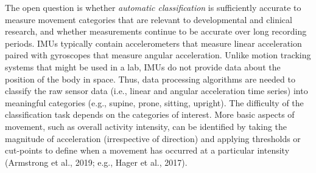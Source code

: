 \documentclass[
  man]{apa6}
\begin{document}
The open question is whether \emph{automatic classification} is sufficiently accurate to measure movement categories that are relevant to developmental and clinical research, and whether measurements continue to be accurate over long recording periods. IMUs typically contain accelerometers that measure linear acceleration paired with gyroscopes that measure angular acceleration. Unlike motion tracking systems that might be used in a lab, IMUs do not provide data about the position of the body in space. Thus, data processing algorithms are needed to classify the raw sensor data (i.e., linear and angular acceleration time series) into meaningful categories (e.g., supine, prone, sitting, upright). The difficulty of the classification task depends on the categories of interest. More basic aspects of movement, such as overall activity intensity, can be identified by taking the magnitude of acceleration (irrespective of direction) and applying thresholds or cut-points to define when a movement has occurred at a particular intensity (Armstrong et al., 2019; e.g., Hager et al., 2017).
\end{document}
